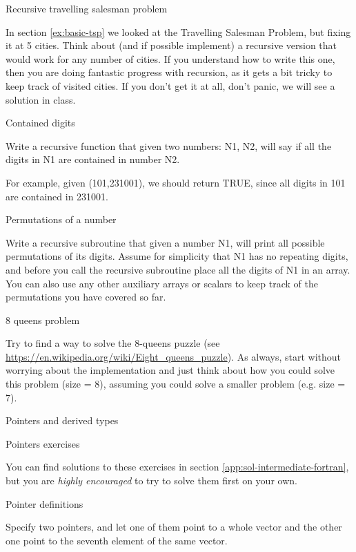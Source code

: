  {Recursive travelling salesman problem}
\label{ex:rec-tsp}

In section \ref{ex:basic-tsp} we looked at the Travelling Salesman Problem, but fixing it
 at 5 cities. Think about (and if possible implement) a recursive version that
 would work for any number of cities. If you understand how to write this one,
 then you are doing fantastic progress with recursion, as it gets a bit tricky
 to keep track of visited cities. If you don't get it at all, don't panic, we
 will see a solution in class.


 {Contained digits}
\label{ex:rec-elf}

Write a recursive function that given two numbers: N1, N2, will say if all the
digits in N1 are contained in number N2.

For example, given (101,231001), we should return TRUE, since all digits in 101
are contained in 231001.

 {Permutations of a number}
\label{ex:rec-perm}

Write a recursive subroutine that given a number N1, will print all possible
permutations of its digits. Assume for simplicity that N1 has no repeating
digits, and before you call the recursive subroutine place all the digits of N1
in an array. You can also use any other auxiliary arrays or scalars to keep
track of the permutations you have covered so far.

 {8 queens problem}
\label{ex:rec-queens}

Try to find a way to solve the 8-queens puzzle (see
\url{https://en.wikipedia.org/wiki/Eight_queens_puzzle}). As always, start
without worrying about the implementation and just think about how you could
solve this problem (size = 8), assuming you could solve a smaller problem
(e.g. size = 7).

 
 {Pointers and derived types}
{}

 {Pointers exercises}
\label{sec:pointers-exercises}

You can find solutions to these exercises in section
\ref{app:sol-intermediate-fortran}, but you are \emph{highly encouraged} to try
to solve them first on your own.

 {Pointer definitions}
\label{ex:pointer-def}

Specify two pointers, and let one of them point to a whole vector and the other
one point to the seventh element of the same vector. 


